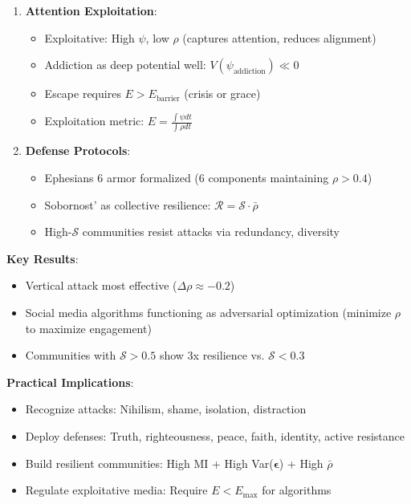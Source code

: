 \documentclass[11pt,a4paper]{article}
\theoremstyle{definition}
\theoremstyle{remark}
\begin{document}
\begin{enumerate}
\begin{protocol}
\begin{mdframed}[backgroundcolor=green!10,linewidth=2pt,linecolor=green!70!black]
\begin{enumerate}[nosep]
    \item \textbf{Attention Exploitation}:
        \begin{itemize}[nosep]
            \item Exploitative: High \(\psi\), low \(\rho\) (captures attention, reduces alignment)
            \item Addiction as deep potential well: \(V(\psi_{\text{addiction}}) \ll 0\)
            \item Escape requires \(E > E_{\text{barrier}}\) (crisis or grace)
            \item Exploitation metric: \(E = \frac{\int \psi dt}{\int \rho dt}\)
        \end{itemize}
    
    \item \textbf{Defense Protocols}:
        \begin{itemize}[nosep]
            \item Ephesians 6 armor formalized (6 components maintaining \(\rho > 0.4\))
            \item Sobornost' as collective resilience: \(\mathcal{R} = \mathcal{S} \cdot \bar{\rho}\)
            \item High-\(\mathcal{S}\) communities resist attacks via redundancy, diversity
        \end{itemize}
\end{enumerate}

\textbf{Key Results}:
\begin{itemize}[nosep]
    \item Vertical attack most effective (\(\Delta\rho \approx -0.2\))
    \item Social media algorithms functioning as adversarial optimization (minimize \(\rho\) to maximize engagement)
    \item Communities with \(\mathcal{S} > 0.5\) show 3x resilience vs. \(\mathcal{S} < 0.3\)
\end{itemize}

\textbf{Practical Implications}:
\begin{itemize}[nosep]
    \item Recognize attacks: Nihilism, shame, isolation, distraction
    \item Deploy defenses: Truth, righteousness, peace, faith, identity, active resistance
    \item Build resilient communities: High MI + High Var(\(\boldsymbol{\epsilon}\)) + High \(\bar{\rho}\)
    \item Regulate exploitative media: Require \(E < E_{\max}\) for algorithms
\end{itemize}


\end{mdframed}
\end{protocol}
\end{enumerate}
\end{document}
